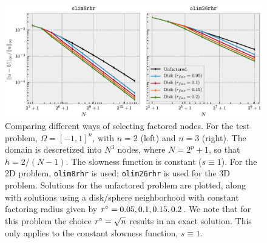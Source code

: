 \documentclass[sisc-eikonal.tex]{subfiles}
\begin{document}
\begin{figure}
  \centering
  \includegraphics[width=\linewidth]{factoring-error-example.eps}%
  \vspace{-1.4em}
  \caption{Comparing different ways of selecting factored nodes. For
    the test problem, $\Omega = [-1, 1]^n$, with $n = 2$ (left) and
    $n = 3$ (right). The domain is descretized into $N^3$ nodes, where
    $N = 2^p + 1$, so that $h = 2/(N - 1)$. The slowness function is
    constant ($s \equiv 1$). For the 2D problem, \texttt{olim8rhr} is
    used; \texttt{olim26rhr} is used for the 3D problem. Solutions for
    the unfactored problem are plotted, along with solutions using a
    disk/sphere neighborhood with constant factoring radius given by
    $r^\circ = 0.05, 0.1, 0.15, 0.2$. We note that for this problem the
    choice $r^\circ = \sqrt{n}$ results in an exact solution. This only
    applies to the constant slowness function, $s \equiv 1$.
  }\label{fig:factoring-error-example}
\end{figure}
\end{document}
